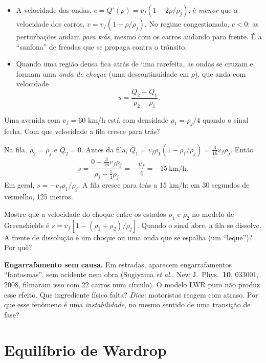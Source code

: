 \documentclass[11pt]{article}
\begin{document}
\begin{ideia}
\begin{itemize}
  \item A velocidade das ondas, $c = Q'(\rho) = v_f(1-2\rho/\rho_j)$, é \emph{menor} que a velocidade dos carros, $v = v_f(1-\rho/\rho_j)$. No regime congestionado, $c<0$: as perturbações andam \emph{para trás}, mesmo com os carros andando para frente. É a ``sanfona'' de freadas que se propaga contra o trânsito.
  \item Quando uma região densa fica atrás de uma rarefeita, as ondas se cruzam e formam uma \emph{onda de choque} (uma descontinuidade em $\rho$), que anda com velocidade
  \[
  s = \frac{Q_2-Q_1}{\rho_2-\rho_1}.
  \]
\end{itemize}
\end{ideia}

\begin{exemplo}
Uma avenida com $v_f = 60$ km/h está com densidade $\rho_1 = \rho_j/4$ quando o sinal fecha. Com que velocidade a fila cresce para trás?
\end{exemplo}
\begin{solucao}
Na fila, $\rho_2 = \rho_j$ e $Q_2 = 0$. Antes da fila, $Q_1 = v_f\rho_1(1-\rho_1/\rho_j) = \tfrac{3}{16}v_f\rho_j$. Então
\[
s = \frac{0-\tfrac3{16}v_f\rho_j}{\rho_j-\tfrac14\rho_j} = -\frac{v_f}{4} = -15\ \text{km/h}.
\]
Em geral, $s = -v_f\rho_1/\rho_j$. A fila cresce para trás a 15 km/h: em 30 segundos de vermelho, 125 metros.
\end{solucao}

 Mostre que a velocidade do choque entre os estados $\rho_1$ e $\rho_2$ no modelo de Greenshields é $s = v_f[1-(\rho_1+\rho_2)/\rho_j]$. Quando o sinal abre, a fila se dissolve. A frente de dissolução é um choque ou uma onda que se espalha (um ``leque'')? Por quê?

 \textbf{Engarrafamento sem causa.} Em estradas, aparecem engarrafamentos ``fantasmas'', sem acidente nem obra (Sugiyama \emph{et al.}, New J.\ Phys.\ \textbf{10}, 033001, 2008, filmaram isso com 22 carros num círculo). O modelo LWR puro não produz esse efeito. Que ingrediente físico falta? \emph{Dica:} motoristas reagem com atraso. Por que esse fenômeno é uma \emph{instabilidade}, no mesmo sentido de uma transição de fase?

\section{Equilíbrio de Wardrop}
\end{document}
